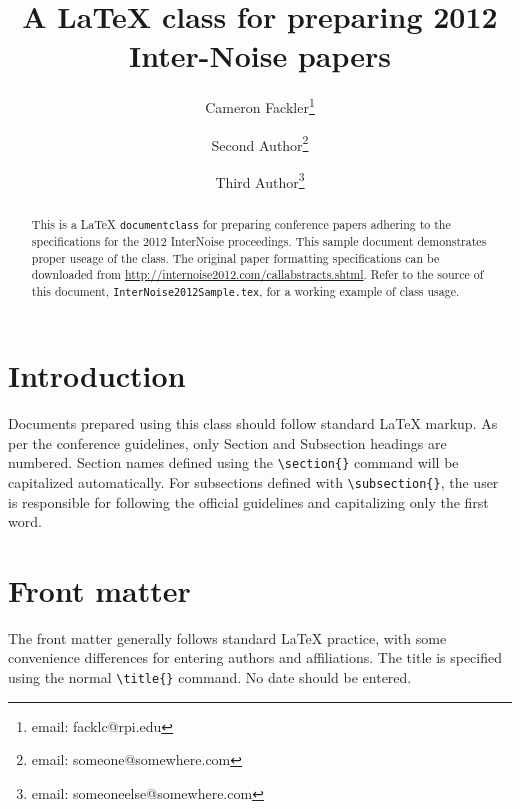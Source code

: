 \documentclass{internoise2012}
\begin{document}
\title{A \LaTeX{} class for preparing 2012 Inter-Noise papers}

\author{Cameron Fackler\thanks{email: facklc@rpi.edu}}

\author{Second Author\thanks{email: someone@somewhere.com}}
\author{Third Author\thanks{email: someoneelse@somewhere.com}}

\maketitle

\begin{abstract}
  This is a \LaTeX{} \texttt{documentclass} for preparing conference
  papers adhering to the specifications for the 2012 InterNoise
  proceedings. This sample document demonstrates proper useage of the
  class. The original paper formatting specifications can be
  downloaded from
  \url{http://internoise2012.com/callabstracts.shtml}. Refer to the
  source of this document, \texttt{InterNoise2012Sample.tex}, for a
  working example of class usage.
\end{abstract}

\section{Introduction}

Documents prepared using this class should follow standard \LaTeX{}
markup. As per the conference guidelines, only Section and Subsection
headings are numbered. Section names defined using the
\texttt{\textbackslash{}section\{\}} command will be capitalized
automatically. For subsections defined with
\texttt{\textbackslash{}subsection\{\}}, the user is responsible for
following the official guidelines and capitalizing only the first word.

\section{Front matter}

The front matter generally follows standard \LaTeX{} practice, with
some convenience differences for entering authors and
affiliations. The title is specified using the normal
\texttt{\textbackslash{}title\{\}} command. No date should be entered.
\end{document}
